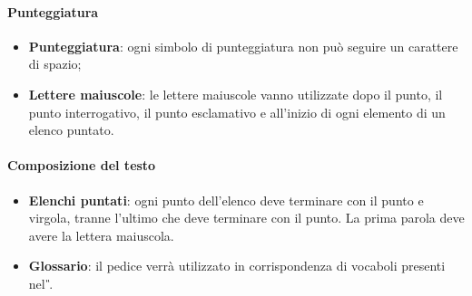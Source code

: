 \paragraph{Punteggiatura}
\begin{itemize}
  \item \textbf{Punteggiatura}: ogni simbolo di punteggiatura non può seguire un 
  carattere di spazio;
  \item \textbf{Lettere maiuscole}: le lettere maiuscole vanno utilizzate dopo il punto, il punto interrogativo, 
  il punto esclamativo e all'inizio di ogni elemento di un elenco puntato.
\end{itemize}
\paragraph{Composizione del testo}
\begin{itemize}
  \item \textbf{Elenchi puntati}: ogni punto dell'elenco deve terminare con il punto e virgola,
   tranne l'ultimo che deve terminare con il punto. La prima parola deve avere la lettera 
   maiuscola.
   \item \textbf{Glossario}: il pedice  verrà utilizzato in corrispondenza di vocaboli presenti nel \textit{\G}.
\end{itemize}
